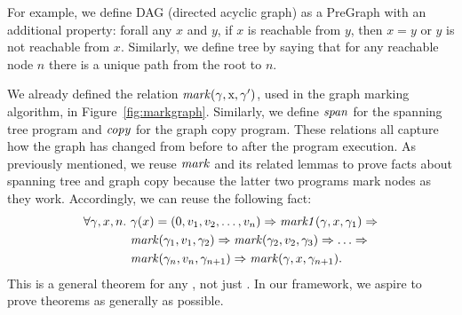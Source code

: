 For example, we define DAG (directed acyclic graph) as a PreGraph with
an additional property: forall any $x$ and $y$, if $x$ is reachable
from $y$, then $x = y$ or $y$ is not reachable from $x$.  Similarly, we define tree 
by saying that for any reachable node $n$ there is a unique path from the root
to $n$.

We already defined the relation $\mathit{mark}(\gamma, \text{x}, \gamma')$, used in 
the graph marking algorithm, in Figure~\ref{fig:markgraph}.  
Similarly, we define $\mathit{span}$ for the spanning tree program
and $\mathit{copy}$ for the graph copy program.  These relations all
capture how the graph has changed from before to after the program 
execution.  As previously mentioned, we reuse $\mathit{mark}$ and its
related lemmas to prove facts about spanning tree and graph copy 
because the latter two programs mark nodes as they work. 
Accordingly, we can reuse the following fact:
\begin{equation*}
\begin{split}
\forall \gamma, x, n.~&\gamma(x)=(0, v_1, v_2,\dots,v_n) => \mathit{mark1}(\gamma, x, \gamma_1) =>\\
        & \mathit{mark}(\gamma_1,v_1,\gamma_2) => \mathit{mark}(\gamma_2,v_2,\gamma_3) => \dots =>\\
        & \mathit{mark}(\gamma_n,v_n,\gamma_{n+1}) => \mathit{mark}(\gamma,x,\gamma_{n+1}).
\end{split}
\end{equation*}
This is a general theorem for any , not just
. In our framework, we aspire to prove theorems as generally as possible.

